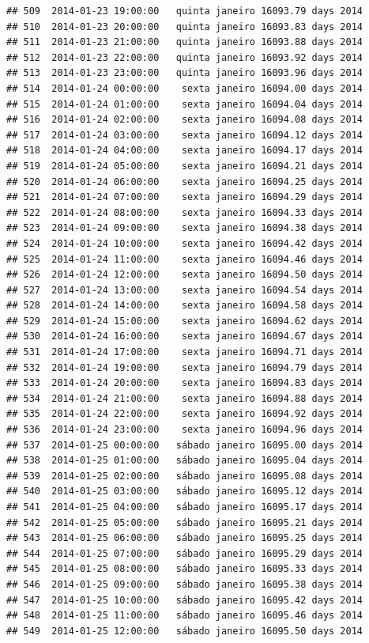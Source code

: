 \documentclass[]{book}
\begin{document}
\begin{verbatim}
## 509  2014-01-23 19:00:00   quinta janeiro 16093.79 days 2014
## 510  2014-01-23 20:00:00   quinta janeiro 16093.83 days 2014
## 511  2014-01-23 21:00:00   quinta janeiro 16093.88 days 2014
## 512  2014-01-23 22:00:00   quinta janeiro 16093.92 days 2014
## 513  2014-01-23 23:00:00   quinta janeiro 16093.96 days 2014
## 514  2014-01-24 00:00:00    sexta janeiro 16094.00 days 2014
## 515  2014-01-24 01:00:00    sexta janeiro 16094.04 days 2014
## 516  2014-01-24 02:00:00    sexta janeiro 16094.08 days 2014
## 517  2014-01-24 03:00:00    sexta janeiro 16094.12 days 2014
## 518  2014-01-24 04:00:00    sexta janeiro 16094.17 days 2014
## 519  2014-01-24 05:00:00    sexta janeiro 16094.21 days 2014
## 520  2014-01-24 06:00:00    sexta janeiro 16094.25 days 2014
## 521  2014-01-24 07:00:00    sexta janeiro 16094.29 days 2014
## 522  2014-01-24 08:00:00    sexta janeiro 16094.33 days 2014
## 523  2014-01-24 09:00:00    sexta janeiro 16094.38 days 2014
## 524  2014-01-24 10:00:00    sexta janeiro 16094.42 days 2014
## 525  2014-01-24 11:00:00    sexta janeiro 16094.46 days 2014
## 526  2014-01-24 12:00:00    sexta janeiro 16094.50 days 2014
## 527  2014-01-24 13:00:00    sexta janeiro 16094.54 days 2014
## 528  2014-01-24 14:00:00    sexta janeiro 16094.58 days 2014
## 529  2014-01-24 15:00:00    sexta janeiro 16094.62 days 2014
## 530  2014-01-24 16:00:00    sexta janeiro 16094.67 days 2014
## 531  2014-01-24 17:00:00    sexta janeiro 16094.71 days 2014
## 532  2014-01-24 19:00:00    sexta janeiro 16094.79 days 2014
## 533  2014-01-24 20:00:00    sexta janeiro 16094.83 days 2014
## 534  2014-01-24 21:00:00    sexta janeiro 16094.88 days 2014
## 535  2014-01-24 22:00:00    sexta janeiro 16094.92 days 2014
## 536  2014-01-24 23:00:00    sexta janeiro 16094.96 days 2014
## 537  2014-01-25 00:00:00   sábado janeiro 16095.00 days 2014
## 538  2014-01-25 01:00:00   sábado janeiro 16095.04 days 2014
## 539  2014-01-25 02:00:00   sábado janeiro 16095.08 days 2014
## 540  2014-01-25 03:00:00   sábado janeiro 16095.12 days 2014
## 541  2014-01-25 04:00:00   sábado janeiro 16095.17 days 2014
## 542  2014-01-25 05:00:00   sábado janeiro 16095.21 days 2014
## 543  2014-01-25 06:00:00   sábado janeiro 16095.25 days 2014
## 544  2014-01-25 07:00:00   sábado janeiro 16095.29 days 2014
## 545  2014-01-25 08:00:00   sábado janeiro 16095.33 days 2014
## 546  2014-01-25 09:00:00   sábado janeiro 16095.38 days 2014
## 547  2014-01-25 10:00:00   sábado janeiro 16095.42 days 2014
## 548  2014-01-25 11:00:00   sábado janeiro 16095.46 days 2014
## 549  2014-01-25 12:00:00   sábado janeiro 16095.50 days 2014

\end{verbatim}
\end{document}
